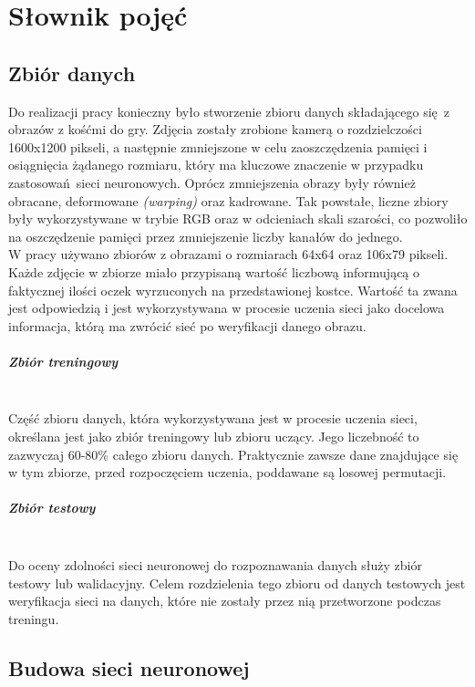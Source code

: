 
\chapter{Słownik pojęć}
\section{Zbiór danych}
Do realizacji pracy konieczny było stworzenie zbioru danych składającego się z obrazów
z kośćmi do gry. Zdjęcia zostały zrobione kamerą o rozdzielczości 1600x1200 pikseli,
a następnie zmniejszone w celu zaoszczędzenia pamięci i osiągnięcia żądanego rozmiaru,
który ma kluczowe znaczenie w przypadku zastosowań sieci neuronowych.
Oprócz zmniejszenia obrazy były również obracane, deformowane \textit{(warping)} oraz kadrowane.
Tak powstałe, liczne zbiory były wykorzystywane w trybie RGB oraz w odcieniach skali szarości,
co pozwoliło na oszczędzenie pamięci przez zmniejszenie liczby kanałów do jednego.\\
W pracy używano zbiorów z obrazami o rozmiarach 64x64 oraz 106x79 pikseli. Każde zdjęcie
w zbiorze miało przypisaną wartość liczbową informującą o faktycznej ilości oczek wyrzuconych
na przedstawionej kostce. Wartość ta zwana jest odpowiedzią i jest wykorzystywana w
procesie uczenia sieci jako docelowa informacja, którą ma zwrócić sieć po weryfikacji danego obrazu.

\paragraph{Zbiór treningowy} \mbox{}\\
Część zbioru danych, która wykorzystywana jest w procesie uczenia sieci, określana jest jako zbiór
treningowy lub zbioru uczący. Jego liczebność to zazwyczaj 60-80\% całego zbioru danych.
Praktycznie zawsze dane znajdujące się w tym zbiorze, przed rozpoczęciem uczenia,
poddawane są losowej permutacji.

\paragraph{Zbiór testowy} \mbox{}\\
Do oceny zdolności sieci neuronowej do rozpoznawania danych służy zbiór testowy lub
walidacyjny. Celem rozdzielenia tego zbioru od danych testowych jest weryfikacja
sieci na danych, które nie zostały przez nią przetworzone podczas treningu.

\section{Budowa sieci neuronowej}
